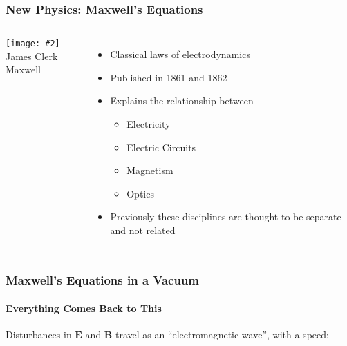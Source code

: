\documentclass[12pt,compress,aspectratio=169]{beamer}
\newcommand{\mb}[1]{\mathbf{#1}}
\newcommand{\pic}[2]{\texttt{[image: \#2]}}
\begin{document}
\begin{frame}
  \frametitle{New Physics: Maxwell's Equations}
  \begin{columns}
    \begin{center}
      \pic{1}{graphics/PORTRAIT-James-Clerk-Maxwell.jpg}\\
      James Clerk Maxwell
    \end{center}
    \begin{itemize}
    \item Classical laws of electrodynamics
    \item Published in 1861 and 1862
    \item Explains the relationship between
      \begin{itemize}
      \item Electricity
      \item Electric Circuits
      \item Magnetism
      \item Optics
      \end{itemize}
    \item Previously these disciplines are thought to be separate and not
      related
    \end{itemize}
  \end{columns}
\end{frame}


\begin{frame}
  \frametitle{Maxwell's Equations in a Vacuum}
  \framesubtitle{Everything Comes Back to This}

  \vspace{-.3in}{\Large
    \begin{align*}
      \nabla\cdot\mb{E} &= 0\\
      \nabla\cdot\mb{B} &= 0\\
      \nabla\times\mb{E} &=-\frac{\partial\mb{B}}{\partial t}\\
      \nabla\times\mb{B} &=\mu_0\varepsilon_0\frac{\partial\mb{E}}{\partial t}
    \end{align*}
  }
  
  \vspace{-.15in}Disturbances in $\mb{E}$ and $\mb{B}$ travel as an
  ``electromagnetic wave'', with a speed:

\end{frame}
\end{document}
